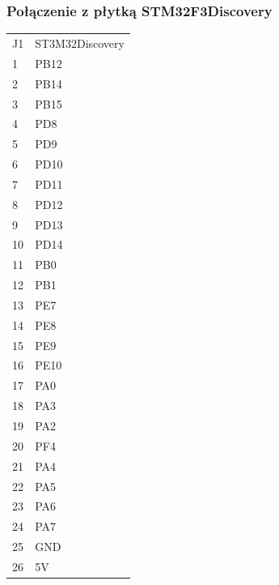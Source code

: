 \documentclass{article}
\begin{document}
\subsubsection{Połączenie z płytką STM32F3Discovery}
\begin{table}[H]
	\centering
	\label{Bill of materials}
\begin{tabular}{ll}
J1		&	ST3M32Discovery	\\
1		&	PB12		\\
2		&	PB14		\\
3		&	PB15		\\
4		&	PD8		\\
5		&	PD9		\\
6		&	PD10		\\
7		&	PD11		\\
8		&	PD12		\\
9		&	PD13		\\
10		&	PD14		\\

11		&	PB0		\\
12		&	PB1		\\
13		&	PE7		\\
14		&	PE8		\\
15		&	PE9		\\
16		&	PE10		\\

17		&	PA0		\\
18		&	PA3		\\
19		&	PA2		\\
20		&	PF4		\\
21		&	PA4		\\
22		&	PA5		\\
23		&	PA6		\\
24		&	PA7		\\

25		&	GND		\\
26		&	5V		\\
\end{tabular}
\end{table}
\end{document}
